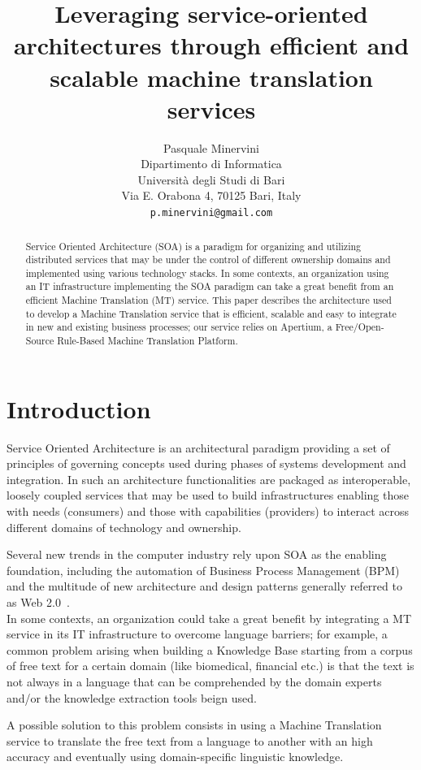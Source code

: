\documentclass[11pt]{article}
\title{Leveraging service-oriented architectures through efficient and scalable machine translation services}
\author{Pasquale Minervini\\
  Dipartimento di Informatica \\
  Università degli Studi di Bari \\
  Via E. Orabona 4, 70125 Bari, Italy \\
  {\tt p.minervini@gmail.com}}
\date{}
\begin{document}
\maketitle

\begin{abstract}
Service Oriented Architecture (SOA) is a paradigm for organizing and utilizing distributed services that may be under the 
control of different ownership domains and implemented using various technology stacks. In some contexts, an organization
using an IT infrastructure implementing the SOA paradigm can take a great benefit from an efficient Machine Translation (MT) service. 
This paper describes the architecture used to develop a Machine Translation service that is efficient, scalable and easy to 
integrate in new and existing business processes; our service relies on Apertium, a Free/Open-Source Rule-Based Machine Translation Platform.
\end{abstract}


\section{Introduction}

Service Oriented Architecture is an architectural paradigm providing  a set of principles of governing concepts used during phases 
of systems development and integration. In such an architecture functionalities are packaged as interoperable, loosely coupled
services that may be used to build infrastructures enabling those with needs (consumers) and those with capabilities (providers) 
to interact across different domains of technology and ownership.

Several new trends in the computer industry rely upon SOA as the enabling foundation, including the automation of Business Process 
Management (BPM) and the multitude of new architecture and design patterns generally referred to as Web 2.0~\citep{web20}.\\

In some contexts, an organization could take a great benefit by integrating a MT service in its IT infrastructure to overcome 
language barriers; for example, a common problem arising when building a Knowledge Base starting from a corpus of free text for
a certain domain (like biomedical, financial etc.) is that the text is not always in a language that can be comprehended by the
domain experts and/or the knowledge extraction tools beign used.

A possible solution to this problem consists in using a Machine Translation service to translate the free text from a language to another with 
an high accuracy and eventually using domain-specific linguistic knowledge.\\%
\end{document}
